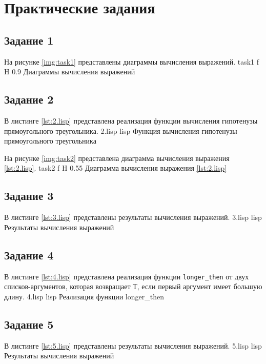 \chapter{Практические задания}

\section{Задание 1}

На рисунке \ref{img:task1} представлены диаграммы вычисления выражений.
	{task1}
	{f}
	{H}
	{0.9\textwidth}
	{Диаграммы вычисления выражений}

\section{Задание 2}

В листинге \ref{lst:2.lisp} представлена реализация функции вычисления гипотенузы прямоугольного треугольника.
	{2.lisp}
	{lisp}
	{Функция вычисления гипотенузы прямоугольного треугольника}
	
На рисунке \ref{img:task2} представлена диаграмма вычисления выражения \ref{lst:2.lisp}.
	{task2}
	{f}
	{H}
	{0.55\textwidth}
	{Диаграмма вычисления выражения \ref{lst:2.lisp}}

\section{Задание 3}

В листинге \ref{lst:3.lisp} представлены результаты вычисления выражений.
	{3.lisp}
	{lisp}
	{Результаты вычисления выражений}

\section{Задание 4}

В листинге \ref{lst:4.lisp} представлена реализация функции \texttt{longer\_then} от двух списков-аргументов, которая возвращает Т, если первый аргумент имеет большую длину.
	{4.lisp}
	{lisp}
	{Реализация функции longer\_then}

\section{Задание 5}

В листинге \ref{lst:5.lisp} представлены результаты вычисления выражений.
	{5.lisp}
	{lisp}
	{Результаты вычисления выражений}

